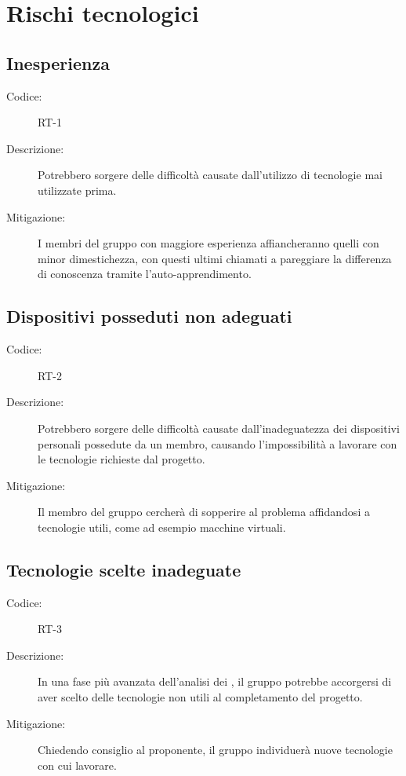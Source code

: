 \section{Rischi tecnologici}

\subsection*{Inesperienza}
\begin{description}
    \item[Codice:] RT-1
    \item[Descrizione:] Potrebbero sorgere delle difficoltà causate dall'utilizzo di tecnologie mai utilizzate prima.
    \item[Mitigazione:] I membri del gruppo con maggiore esperienza affiancheranno quelli con minor dimestichezza, con questi ultimi chiamati a pareggiare la differenza di conoscenza tramite l'auto-apprendimento.
\end{description}

\subsection*{Dispositivi posseduti non adeguati}
\begin{description}
    \item[Codice:] RT-2
    \item[Descrizione:] Potrebbero sorgere delle difficoltà causate dall'inadeguatezza dei dispositivi personali possedute da un membro, causando l'impossibilità a lavorare con le tecnologie richieste dal progetto.
    \item[Mitigazione:] Il membro del gruppo cercherà di sopperire al problema affidandosi a tecnologie utili, come ad esempio macchine virtuali.
\end{description}

\subsection*{Tecnologie scelte inadeguate}
\begin{description}
    \item[Codice:] RT-3
    \item[Descrizione:] In una fase più avanzata dell'analisi dei , il gruppo potrebbe accorgersi di aver scelto delle tecnologie non utili al completamento del progetto.
    \item[Mitigazione:] Chiedendo consiglio al proponente, il gruppo individuerà nuove tecnologie con cui lavorare.
\end{description}

